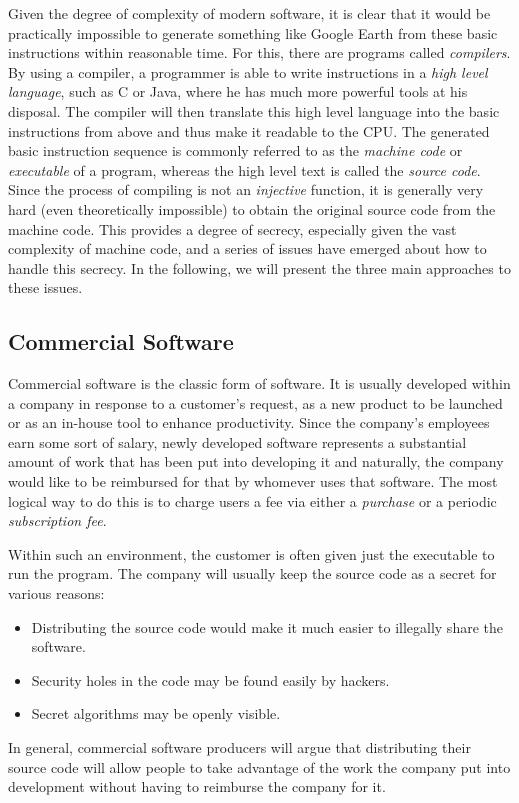 \documentclass{article}
\begin{document}
Given the degree of complexity of modern software, it is clear that
it would be practically impossible to generate something like Google
Earth from these basic instructions within reasonable time. For this,
there are programs called \emph{compilers}. By using a compiler, a
programmer is able to write instructions in a \emph{high level language},
such as C or Java, where he has much more powerful tools at his
disposal. The compiler will then translate this high level language
into the basic instructions from above and thus make it readable to
the CPU. The generated basic instruction sequence is commonly referred
to as the \emph{machine code} or \emph{executable} of a program,
whereas the high level
text is called the \emph{source code}. Since the process of compiling
is not an \emph{injective} function, it is generally very hard
(even theoretically impossible) to obtain the original source code
from the machine code. This provides a degree of secrecy, especially
given the vast complexity of machine code, and a series of issues
have emerged about how to handle this secrecy. In the following, we
will present the three main approaches to these issues. 
\subsection{Commercial Software}
Commercial software is the classic form of software. It is usually
developed
within a company in response to a customer's request, as a new product
to be launched or as an in-house tool to enhance productivity.
Since the company's employees earn some sort of salary, newly
developed software represents a substantial amount of work that
has been put into developing it and naturally, the company would like
to be reimbursed for that by whomever uses that software. The most
logical way to do this is to charge users a fee via either a 
\emph{purchase} or a periodic \emph{subscription fee}.

Within such an environment, the customer is often given just the
executable to run the program. The company will usually keep the
source code as a secret for various reasons:
\begin{itemize}
  \item Distributing the source code would make it much easier to
illegally share the software.
\item Security holes in the code may be found easily by hackers.
\item Secret algorithms may be openly visible.
\end{itemize}
In general, commercial software producers will argue that
distributing their source code will allow people to take advantage
of the work the company put into development without having to
reimburse the company for it.
\end{document}
